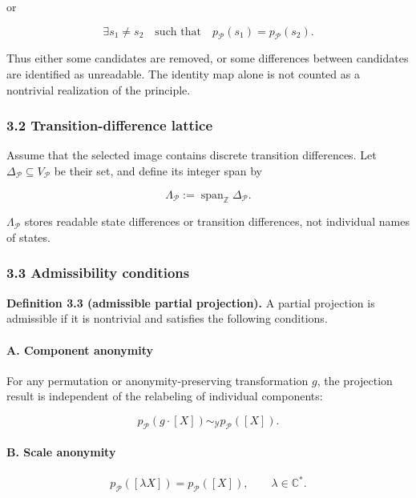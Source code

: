 \documentclass[
  a4paper,
]{article}
\begin{document}
or

\[
\exists s_1\neq s_2
\quad\text{such that}\quad
p_{\mathcal P}(s_1)
=
p_{\mathcal P}(s_2).
\]

Thus either some candidates are removed, or some differences between
candidates are identified as unreadable. The identity map alone is not
counted as a nontrivial realization of the principle.

\subsubsection{3.2 Transition-difference
lattice}\label{transition-difference-lattice}

Assume that the selected image contains discrete transition differences.
Let \(\Delta_{\mathcal P}\subseteq V_{\mathcal P}\) be their set, and
define its integer span by

\[
\Lambda_{\mathcal P}
:=
\operatorname{span}_{\mathbb Z}
\Delta_{\mathcal P}.
\]

\(\Lambda_{\mathcal P}\) stores readable state differences or transition
differences, not individual names of states.

\subsubsection{3.3 Admissibility
conditions}\label{admissibility-conditions}

\textbf{Definition 3.3 (admissible partial projection).} A partial
projection is admissible if it is nontrivial and satisfies the following
conditions.

\paragraph{A. Component anonymity}\label{a.-component-anonymity}

For any permutation or anonymity-preserving transformation \(g\), the
projection result is independent of the relabeling of individual
components:

\[
p_{\mathcal P}(g\cdot[X])
\sim_{\mathscr Y}
p_{\mathcal P}([X]).
\]

\paragraph{B. Scale anonymity}\label{b.-scale-anonymity}

\[
p_{\mathcal P}([\lambda X])
=
p_{\mathcal P}([X]),
\qquad
\lambda\in\mathbb C^\ast.
\]
\end{document}
